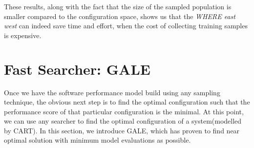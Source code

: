 \documentclass{sig-alternative}
\begin{document}
These results, along with the fact that the size of the sampled population is smaller compared to the configuration space, shows us that the \textit{WHERE east west} can indeed save time and effort, when the cost of collecting training samples is expensive.

\section{Fast Searcher: GALE}
Once we have the software performance model build using any sampling technique, the obvious next step is to find the optimal configuration such that the performance score of that particular configuration is the minimal. At this point, we can use any searcher to find the optimal configuration of a system(modelled by CART). In this section, we introduce GALE, which has proven to find near optimal solution with minimum model evaluations as possible. 
\end{document}

